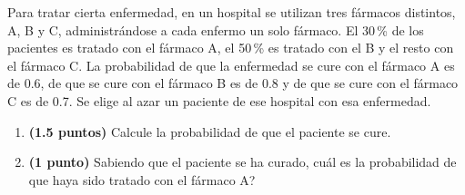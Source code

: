 
Para tratar cierta enfermedad, en un hospital se utilizan tres fármacos
distintos, A, B y C, administrándose a cada enfermo un solo fármaco. El
30\,\% de los pacientes es tratado con el fármaco A, el 50\,\% es tratado
con el B y el resto con el fármaco C. La probabilidad de que la enfermedad
se cure con el fármaco A es de 0.6, de que se cure con el fármaco B es de
0.8 y de que se cure con el fármaco C es de 0.7. Se elige al azar un paciente
de ese hospital con esa enfermedad.
\begin{enumerate}[label=\alph*)]
  \item \textbf{(1.5 puntos)} Calcule la probabilidad de que el paciente se
  cure.
  \item \textbf{(1 punto)} Sabiendo que el paciente se ha curado,
  \textquestiondown{}cuál es la probabilidad de que haya sido tratado con
  el fármaco A?
\end{enumerate}
